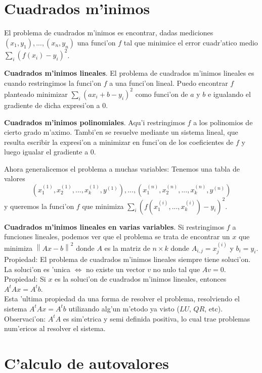 \documentclass[a4paper,spanish]{article}
\newcommand{\norma}[1]{\left\|#1\right\|}
\newcommand{\liff}[0]{\Leftrightarrow}
\begin{document}
\section{Cuadrados m'inimos}

El problema de cuadrados m'inimos es encontrar, dadas mediciones 
$(x_1,y_1),...,(x_n,y_n)$ una funci'on $f$ tal que minimice el error
cuadr'atico medio $\sum_i (f(x_i)-y_i)^2$.

\textbf{Cuadrados m'inimos lineales}. El problema de cuadrados m'inimos
lineales es cuando restringimos la funci'on $f$ a una funci'on lineal. Puedo
encontrar $f$ planteado minimizar $\sum_i (a x_i + b - y_i)^2$ como funci'on
de $a$ y $b$ e igualando el gradiente de dicha expresi'on a $0$.

\textbf{Cuadrados m'inimos polinomiales}. Aqu'i restringimos $f$ a los
polinomios de cierto grado m'aximo. Tambi'en se resuelve mediante un sistema
lineal, que resulta escribir la expresi'on a minimizar en funci'on de los
coeficientes de $f$ y luego igualar el gradiente a $0$.

Ahora generalicemos el problema a muchas variables: Tenemos una tabla de
valores 
$$(x_1^{(1)},x_2^{(1)},...,x_k^{(1)},y^{(1)}),...,
(x_1^{(n)},x_2^{(n)},...,x_k^{(n)},y^{(n)})$$
 y queremos la funci'on $f$ que
minimiza $\sum_i (f(x_1^{(i)},...,x_k^{(i)})-y_i)^2$.

\textbf{Cuadrados m'inimos lineales en varias variables}. Si restringimos $f$
a funciones lineales, podemos ver que el problema se trata de encontrar un
$x$ que minimiza $\norma{Ax-b}^2$ donde $A$ es la matriz de $n \times k$ donde 
$A_{i,j} = x_j^{(i)}$ y $b_i = y_i$. \\
Propiedad: El problema de cuadrados m'inimos lineales siempre tiene soluci'on.
La soluci'on es 'unica $\liff$ no existe un vector $v$ no nulo tal que 
$Av = 0$. \\
Propiedad: Si $x$ es la soluci'on de cuadrados m'inimos lineales, entonces
$A^t A x = A^t b$. \\
Esta 'ultima propiedad da una forma de resolver el problema, resolviendo el
sistema $A^t A x = A^t b$ utilizando alg'un m'etodo ya visto ($LU$, $QR$, 
etc). \\
Observaci'on: $A^t A$ es sim'etrica y semi definida positiva, lo cual trae
problemas num'ericos al resolver el sistema.

\section{C'alculo de autovalores}
\end{document}
